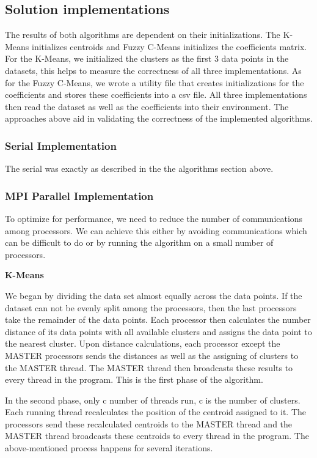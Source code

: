 \begin{multicols*}{2}
    \subsection{Solution implementations}
    The results of both algorithms are dependent on their initializations. The K-Means initializes centroids and Fuzzy C-Means initializes the coefficients matrix. For the K-Means, we initialized the clusters as the first 3 data points in the datasets, this helps to measure the correctness of all three implementations. As for the Fuzzy C-Means, we wrote a utility file that creates initializations for the coefficients and stores these coefficients into a csv file. All three implementations then read the dataset as well as the coefficients into their environment. The approaches above aid in validating the correctness of the implemented algorithms.

    \subsubsection{Serial Implementation}
    The serial was exactly as described in the the algorithms section above. 

    \subsubsection{MPI Parallel Implementation}
    To optimize for performance, we need to reduce the number of communications among processors. We can achieve this either by avoiding communications which can be difficult to do or by running the algorithm on a small number of processors.
    
    \textbf{K-Means}

    We began by dividing the data set almost equally across the data points. If the dataset can not be evenly split among the processors, then the last processors take the remainder of the data points. Each processor then calculates the number distance of its data points with all available clusters and assigns the data point to the nearest cluster. Upon distance calculations, each processor except the MASTER processors sends the distances as well as the assigning of clusters to the MASTER thread. The MASTER thread then broadcasts these results to every thread in the program. This is the first phase of the algorithm. 

    In the second phase, only c number of threads run, c is the number of clusters. Each running thread recalculates the position of the centroid assigned to it. The processors send these recalculated centroids to the MASTER thread and the MASTER thread broadcasts these centroids to every thread in the program. The above-mentioned process happens for several iterations. 
    

\end{multicols*}
